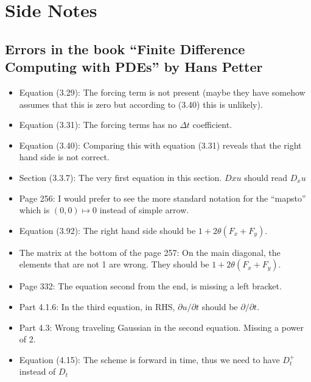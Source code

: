 \chapter{Side Notes}

\section{Errors in the book ``Finite Difference Computing with PDEs'' by Hans Petter}
\begin{itemize}[noitemsep]
	\item Equation (3.29): The forcing term is not present (maybe they have somehow assumes that this is zero but according to (3.40) this is unlikely).
	\item Equation (3.31): The forcing terms has no $ \Delta t $ coefficient.
	\item Equation (3.40): Comparing this with equation (3.31) reveals that the right hand side is not correct.
	\item Section (3.3.7): The very first equation in this section. $ Dxu $ should read $ D_x u $
	\item Page 256: I would prefer to see the more standard notation for the ``mapsto'' which is $ (0,0) \mapsto 0 $ instead of simple arrow.
	\item Equation (3.92): The right hand side should be $ 1 + 2\theta (F_x+F_y) $.
	\item The matrix at the bottom of the page 257: On the main diagonal, the elements that are not 1 are wrong. They should be $ 1 + 2\theta(F_x+F_y) $.
	\item Page 332: The equation second from the end, is missing a left bracket.
	\item Part 4.1.6: In the third equation, in RHS, $ \partial u/\partial t $ should be $ \partial/\partial t $.
	\item Part 4.3: Wrong traveling Gaussian in the second equation. Missing a power of 2.
	\item Equation (4.15): The scheme is forward in time, thus we need to have $ D_t^+ $ instead of $ D_t $ 
\end{itemize}